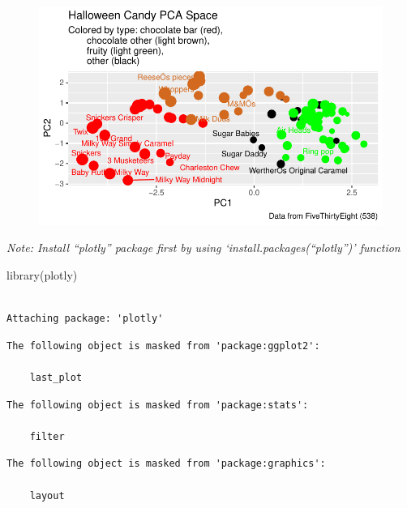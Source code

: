 \documentclass[
  letterpaper,
  DIV=11,
  numbers=noendperiod]{scrartcl}
\newenvironment{Shaded}{\begin{snugshade}}{\end{snugshade}}
\newcommand{\FunctionTok}[1]{\textcolor[rgb]{0.28,0.35,0.67}{#1}}
\newcommand{\NormalTok}[1]{\textcolor[rgb]{0.00,0.23,0.31}{#1}}
\begin{document}
\begin{figure}[H]

{\centering \includegraphics{class10_files/figure-pdf/unnamed-chunk-33-1.pdf}

}

\end{figure}

\emph{Note: Install ``plotly'' package first by using
`install.packages(``plotly'')' function}

\begin{Shaded}
\begin{Highlighting}[]
\FunctionTok{library}\NormalTok{(plotly)}
\end{Highlighting}
\end{Shaded}

\begin{verbatim}

Attaching package: 'plotly'
\end{verbatim}

\begin{verbatim}
The following object is masked from 'package:ggplot2':

    last_plot
\end{verbatim}

\begin{verbatim}
The following object is masked from 'package:stats':

    filter
\end{verbatim}

\begin{verbatim}
The following object is masked from 'package:graphics':

    layout
\end{verbatim}
\end{document}
